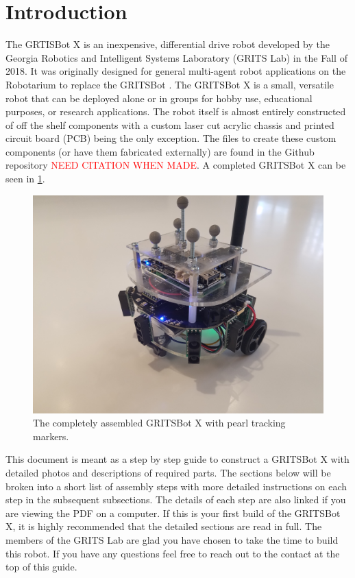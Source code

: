 \section{Introduction}
\label{sec:intro}

The GRTISBot X is an inexpensive, differential drive robot developed by the Georgia Robotics and Intelligent Systems Laboratory (GRITS Lab) in the Fall of 2018. It was originally designed for general multi-agent robot applications on the Robotarium \cite{robotarium,robotariumWebsite} to replace the GRITSBot \cite{GRITSBot}. The GRITSBot X is a small, versatile robot that can be deployed alone or in groups for hobby use, educational purposes, or research applications. The robot itself is almost entirely constructed of off the shelf components with a custom laser cut acrylic chassis and printed circuit board (PCB) being the only exception. The files to create these custom components (or have them fabricated externally) are found in the Github repository {\textcolor{red}{NEED CITATION WHEN MADE}}. A completed GRITSBot X can be seen in \cref{fig:GRITSBotX_Full}.

\begin{figure}[!h]
\centering
\includegraphics[width=0.65\columnwidth, keepaspectratio]{./figs/20190104_131309.jpg}
\caption{The completely assembled GRITSBot X with pearl tracking markers.}
\label{fig:GRITSBotX_Full}
\end{figure}

This document is meant as a step by step guide to construct a GRITSBot X with detailed photos and descriptions of required parts. The sections below will be broken into a short list of assembly steps with more detailed instructions on each step in the subsequent subsections. The details of each step are also linked if you are viewing the PDF on a computer. If this is your first build of the GRITSBot X, it is highly recommended that the detailed sections are read in full. The members of the GRITS Lab are glad you have chosen to take the time to build this robot. If you have any questions feel free to reach out to the contact at the top of this guide.
